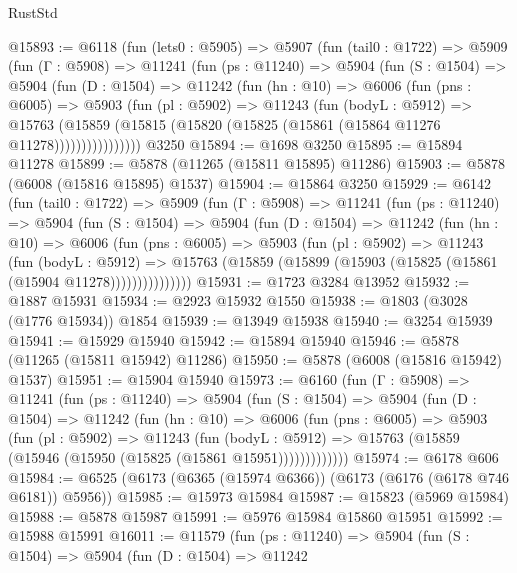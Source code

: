 \begin{lexlean}{RustStd}
\begin{coremodule}
@15893 := @6118
    (fun (lets0 : @5905) =>
    @5907
      (fun (tail0 : @1722) =>
      @5909
        (fun (Γ : @5908) =>
        @11241
          (fun (ps : @11240) =>
          @5904
            (fun (S : @1504) =>
            @5904
              (fun (D : @1504) =>
              @11242
                (fun (hn : @10) =>
                @6006
                  (fun (pns : @6005) =>
                  @5903
                    (fun (pl : @5902) =>
                    @11243
                      (fun (bodyL : @5912) =>
                      @15763
                        (@15859
                          (@15815 (@15820 (@15825 (@15861 (@15864 @11276 @11278))))))))))))))))
    @3250
@15894 := @1698 @3250
@15895 := @15894 @11278
@15899 := @5878 (@11265 (@15811 @15895) @11286)
@15903 := @5878 (@6008 (@15816 @15895) @1537)
@15904 := @15864 @3250
@15929 := @6142
    (fun (tail0 : @1722) =>
    @5909
      (fun (Γ : @5908) =>
      @11241
        (fun (ps : @11240) =>
        @5904
          (fun (S : @1504) =>
          @5904
            (fun (D : @1504) =>
            @11242
              (fun (hn : @10) =>
              @6006
                (fun (pns : @6005) =>
                @5903
                  (fun (pl : @5902) =>
                  @11243
                    (fun (bodyL : @5912) =>
                    @15763 (@15859 (@15899 (@15903 (@15825 (@15861 (@15904 @11278)))))))))))))))
@15931 := @1723 @3284 @13952
@15932 := @1887 @15931
@15934 := @2923 @15932 @1550
@15938 := @1803 (@3028 (@1776 @15934)) @1854
@15939 := @13949 @15938
@15940 := @3254 @15939
@15941 := @15929 @15940
@15942 := @15894 @15940
@15946 := @5878 (@11265 (@15811 @15942) @11286)
@15950 := @5878 (@6008 (@15816 @15942) @1537)
@15951 := @15904 @15940
@15973 := @6160
    (fun (Γ : @5908) =>
    @11241
      (fun (ps : @11240) =>
      @5904
        (fun (S : @1504) =>
        @5904
          (fun (D : @1504) =>
          @11242
            (fun (hn : @10) =>
            @6006
              (fun (pns : @6005) =>
              @5903
                (fun (pl : @5902) =>
                @11243
                  (fun (bodyL : @5912) =>
                  @15763 (@15859 (@15946 (@15950 (@15825 (@15861 @15951)))))))))))))
@15974 := @6178 @606
@15984 := @6525 (@6173 (@6365 (@15974 @6366)) (@6173 (@6176 (@6178 @746 @6181)) @5956))
@15985 := @15973 @15984
@15987 := @15823 (@5969 @15984)
@15988 := @5878 @15987
@15991 := @5976 @15984 @15860 @15951
@15992 := @15988 @15991
@16011 := @11579
    (fun (ps : @11240) =>
    @5904
      (fun (S : @1504) =>
      @5904
        (fun (D : @1504) =>
        @11242

\end{coremodule}
\end{lexlean}
